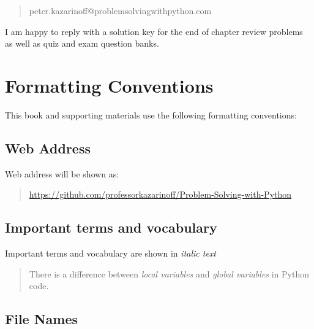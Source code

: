 \documentclass{book}
\begin{document}
\begin{quote}
peter.kazarinoff@problemsolvingwithpython.com
\end{quote}

I am happy to reply with a solution key for the end of chapter review
problems as well as quiz and exam question banks.
    




    
        \hypertarget{formatting-conventions}{%
\section{Formatting Conventions}\label{formatting-conventions}}
    




    
        This book and supporting materials use the following formatting
conventions:
    




    
        \hypertarget{web-address}{%
\subsection{Web Address}\label{web-address}}

Web address will be shown as:

\begin{quote}
\url{https://github.com/professorkazarinoff/Problem-Solving-with-Python}
\end{quote}
    




    
        \hypertarget{important-terms-and-vocabulary}{%
\subsection{Important terms and
vocabulary}\label{important-terms-and-vocabulary}}

Important terms and vocabulary are shown in \emph{italic text}

\begin{quote}
There is a difference between \emph{local variables} and \emph{global
variables} in Python code.
\end{quote}
    




    
        \hypertarget{file-names}{%
\subsection{File Names}\label{file-names}}
\end{document}
